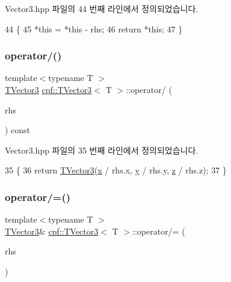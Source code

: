Vector3.\+hpp 파일의 44 번째 라인에서 정의되었습니다.


\begin{DoxyCode}
44                                                   \{
45             *\textcolor{keyword}{this} = *\textcolor{keyword}{this} - rhs;
46             \textcolor{keywordflow}{return} *\textcolor{keyword}{this};
47         \}
\end{DoxyCode}
\mbox{\label{classcpf_1_1_t_vector3_ab9705825c33bf595373843caa18c91f3}} 
\subsubsection{\texorpdfstring{operator/()}{operator/()}}
{\footnotesize\ttfamily template$<$typename T $>$ \\
\hyperlink{classcpf_1_1_t_vector3}{T\+Vector3} \hyperlink{classcpf_1_1_t_vector3}{cpf\+::\+T\+Vector3}$<$ T $>$\+::operator/ (\begin{DoxyParamCaption}\item[{const \hyperlink{classcpf_1_1_t_vector3}{T\+Vector3}$<$ T $>$ \&}]{rhs }\end{DoxyParamCaption}) const\hspace{0.3cm}{\ttfamily [inline]}}



Vector3.\+hpp 파일의 35 번째 라인에서 정의되었습니다.


\begin{DoxyCode}
35                                                       \{
36             \textcolor{keywordflow}{return} \hyperlink{classcpf_1_1_t_vector3_a31544bebbd3d8737adf44460256b57fd}{TVector3}(\hyperlink{classcpf_1_1_t_vector3_ad3df42808358a64c518d6349ede446d8}{x} / rhs.x, \hyperlink{classcpf_1_1_t_vector3_a2371a0583e76dcc80c6f10dd168cde1b}{y} / rhs.y, \hyperlink{classcpf_1_1_t_vector3_ae7ea5f4b24c3438a44eb6b0fdfe02823}{z} / rhs.z);
37         \}
\end{DoxyCode}
\mbox{\label{classcpf_1_1_t_vector3_a47de6d14092c37e5e9cedea2a78e1351}} 
\subsubsection{\texorpdfstring{operator/=()}{operator/=()}}
{\footnotesize\ttfamily template$<$typename T $>$ \\
\hyperlink{classcpf_1_1_t_vector3}{T\+Vector3}\& \hyperlink{classcpf_1_1_t_vector3}{cpf\+::\+T\+Vector3}$<$ T $>$\+::operator/= (\begin{DoxyParamCaption}\item[{const \hyperlink{classcpf_1_1_t_vector3}{T\+Vector3}$<$ T $>$ \&}]{rhs }\end{DoxyParamCaption})\hspace{0.3cm}{\ttfamily [inline]}}



